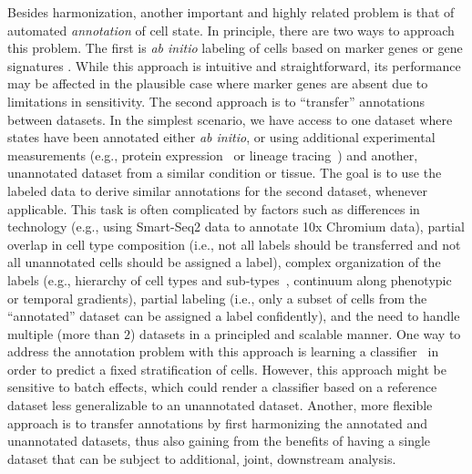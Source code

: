 Besides harmonization, another important and highly related problem is that of automated \textit{annotation} of cell state. In principle, there are two ways to approach this problem. The first is \textit{ab initio} labeling of cells based on marker genes or gene signatures \cite{seurat,VISION,fastproject}. While this approach is intuitive and straightforward, its performance may be affected in the plausible case where marker genes are absent due to limitations in sensitivity. The second approach is to ``transfer'' annotations between datasets. In the simplest scenario, we have access to one dataset where states have been annotated either \textit{ab initio}, or using additional experimental measurements (e.g., protein expression~\cite{zheng2017massively, stoeckius2017simultaneous} or lineage tracing~\cite{Weinreb467886}) and another, unannotated dataset from a similar condition or tissue. The goal is to use the labeled data to derive similar annotations for the second dataset, whenever applicable. This task is often complicated by factors such as differences in technology (e.g., using Smart-Seq2 data to annotate 10x Chromium data), partial overlap in cell type composition (i.e., not all labels should be transferred and not all unannotated cells should be assigned a label), complex organization of the labels (e.g., hierarchy of cell types and sub-types~\cite{Moana}, continuum along phenotypic or temporal gradients), partial labeling (i.e., only a subset of cells from the ``annotated'' dataset can be assigned a label confidently), and the need to handle multiple (more than $2$) datasets in a principled and scalable manner. One way to address the annotation problem with this approach is  learning a classifier~\cite{Moana, scmap} in order to predict a fixed stratification of cells. However, this approach might be sensitive to batch effects, which could render a classifier based on a reference dataset less generalizable to an unannotated dataset. Another, more flexible approach is to transfer annotations by first harmonizing the annotated and unannotated datasets, thus also gaining from the benefits of having a single dataset that can be subject to additional, joint, downstream analysis.

